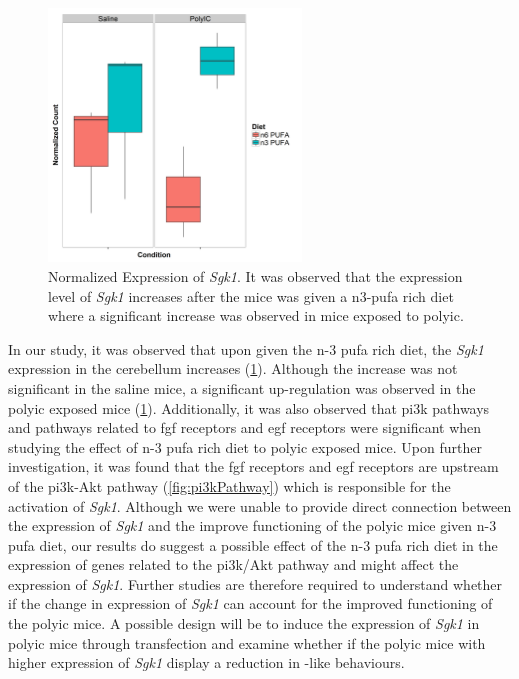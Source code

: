 \documentclass[12pt]{scrbook}
\newcommand*{\glng}{\glsentrylong}
\begin{document}
\begin{figure}
	\centering
	\includegraphics[width=0.6\textwidth]{figure/omega/Sgk1_expression.png}
	\caption[Normalized Expression of \textit{Sgk1}]{
		Normalized Expression of \textit{Sgk1}.
		It was observed that the expression level of \textit{Sgk1} increases after the mice was given a n3-\gls{pufa} rich diet where a significant increase was observed in mice exposed to \gls{polyic}.
	}\label{fig:sgk1Express}
\end{figure}

In our study, it was observed that upon given the n-3 \gls{pufa} rich diet, the \textit{Sgk1} expression in the cerebellum increases (\cref{fig:sgk1Express}).
Although the increase was not significant in the saline mice, a significant up-regulation was observed in the \gls{polyic} exposed mice (\cref{fig:sgk1Express}). 
Additionally, it was also observed that \gls{pi3k} pathways and pathways related to \gls{fgf} receptors and \gls{egf} receptors were significant when studying the effect of n-3 \gls{pufa} rich diet to \gls{polyic} exposed mice.
Upon further investigation, it was found that the \gls{fgf} receptors and \gls{egf} receptors are upstream of the \gls{pi3k}-Akt pathway (\cref{fig:pi3kPathway}) which is responsible for the activation of \textit{Sgk1}.
Although we were unable to provide direct connection between the expression of \textit{Sgk1} and the improve functioning of the \gls{polyic} mice given n-3 \gls{pufa} diet, our results do suggest a possible effect of the n-3 \gls{pufa} rich diet in the expression of genes related to the \gls{pi3k}/Akt pathway and might affect the expression of \textit{Sgk1}.
Further studies are therefore required to understand whether if the change in expression of \textit{Sgk1} can account for the improved functioning of the \gls{polyic} mice. 
A possible design will be to induce the expression of \textit{Sgk1} in \gls{polyic} mice through transfection and examine whether if the \gls{polyic} mice with higher expression of \textit{Sgk1} display a reduction in \glng{scz}-like behaviours.
\end{document}
